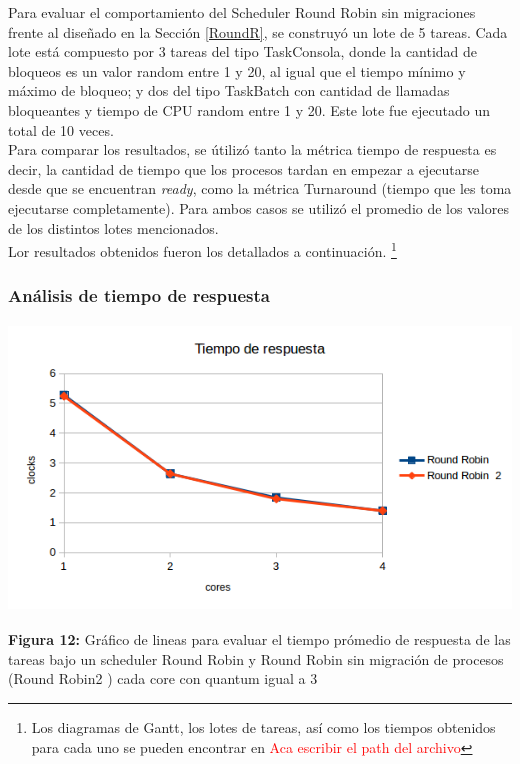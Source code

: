 \documentclass[a4paper]{article}
\begin{document}
Para evaluar el comportamiento del Scheduler Round Robin sin migraciones frente al diseñado en la Sección \ref{RoundR}, se construy\'o un lote de 5 tareas. Cada lote est\'a compuesto por 3 tareas del tipo TaskConsola, donde la cantidad de bloqueos es un valor random entre 1 y 20, al igual que el tiempo mínimo y máximo de bloqueo; y dos del tipo TaskBatch con cantidad de llamadas bloqueantes y tiempo de CPU random entre 1 y 20. Este lote fue ejecutado un total de 10 veces.\\


Para comparar los resultados, se útilizó tanto la métrica tiempo de respuesta es decir, la cantidad de tiempo que los procesos tardan en empezar a ejecutarse desde que se encuentran \emph{ready}, como la m\'etrica Turnaround (tiempo que les toma ejecutarse completamente). Para ambos casos se utilizó el promedio de los valores de los distintos lotes mencionados. \\

Lor resultados obtenidos fueron los detallados a continuaci\'on. \footnote{Los diagramas de Gantt, los lotes de tareas, así como los tiempos obtenidos para cada uno se pueden encontrar en \textcolor{red}{Aca escribir el path del archivo}}

\newpage
\subsubsection*{An\'alisis de tiempo de respuesta}
\includegraphics[width=\textwidth,height=3.0in,keepaspectratio
]{imagenes/ej8/tr.png} \\
\begin {flushleft}
\textbf{Figura 12:} Gráfico de lineas para evaluar el tiempo prómedio de respuesta de las tareas bajo un scheduler Round Robin y Round Robin sin migración de procesos (Round Robin2 ) cada core con quantum igual a 3
\end{flushleft}	
\end{document}
